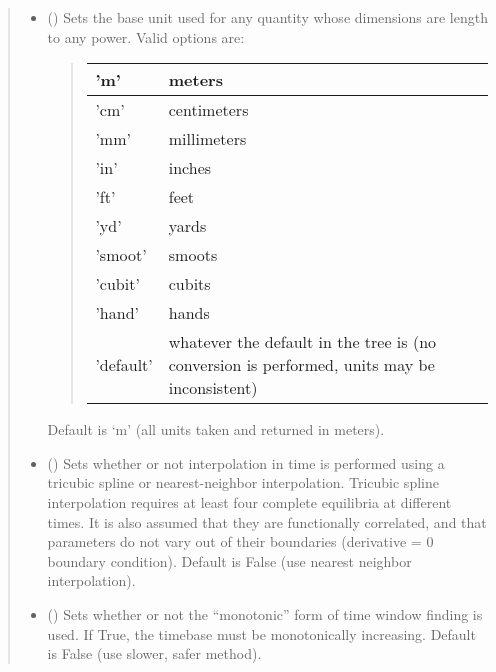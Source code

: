 \documentclass[letterpaper,10pt,english]{sphinxmanual}
\begin{document}
\begin{fulllineitems}
\begin{quote}
\begin{description}
\begin{itemize}
\item {} 
 () \textendash{} 
Sets the base unit used for any quantity whose
dimensions are length to any power. Valid options are:
\begin{quote}


\begin{savenotes}\sphinxattablestart
\centering
\begin{tabulary}{\linewidth}[t]{|T|T|}
\hline

’m’
&
meters
\\
\hline
’cm’
&
centimeters
\\
\hline
’mm’
&
millimeters
\\
\hline
’in’
&
inches
\\
\hline
’ft’
&
feet
\\
\hline
’yd’
&
yards
\\
\hline
’smoot’
&
smoots
\\
\hline
’cubit’
&
cubits
\\
\hline
’hand’
&
hands
\\
\hline
’default’
&
whatever the default in the tree is (no conversion is performed, units may be inconsistent)
\\
\hline
\end{tabulary}
\par
\sphinxattableend\end{savenotes}
\end{quote}

Default is ‘m’ (all units taken and returned in meters).


\item {} 
 () \textendash{} Sets whether or not interpolation in time is
performed using a tricubic spline or nearest-neighbor
interpolation. Tricubic spline interpolation requires at least
four complete equilibria at different times. It is also assumed
that they are functionally correlated, and that parameters do
not vary out of their boundaries (derivative = 0 boundary
condition). Default is False (use nearest neighbor interpolation).

\item {} 
 () \textendash{} Sets whether or not the “monotonic” form of time
window finding is used. If True, the timebase must be monotonically
increasing. Default is False (use slower, safer method).


\end{itemize}
\end{description}
\end{quote}
\end{fulllineitems}
\end{document}
